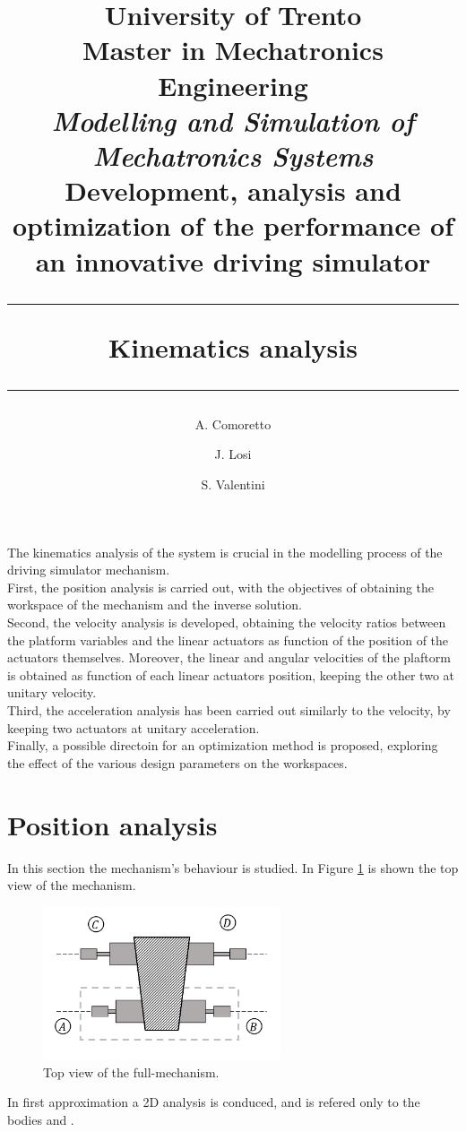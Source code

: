 \documentclass[10.5pt, twocolumn]{article}
\title{
	\large{University of Trento}\\
	\normalsize{Master in Mechatronics Engineering}\\
	\vspace{0.2cm}
	\large{\textit{Modelling and Simulation of Mechatronics Systems}}\\
	\vspace{0.2cm}
	\Large{\textbf{Development, analysis and optimization of the performance of an innovative driving simulator}}\\
	\vspace{0.25cm}
	\hrule
	\vspace{0.2cm}
	\large{\textbf{Kinematics analysis}}\\	%
	\vspace{0.2cm}
	\hrule
}
\author{A. Comoretto \and J. Losi \and S. Valentini}
\date{\vspace{0.5cm}}
\newcommand*\circled[1]{\tikz[baseline=(char.base)]{
	\node[shape=circle,draw,inner sep=2pt] (char) {#1};}}
\begin{document}
\maketitle

The kinematics analysis of the system is crucial in the modelling process of the driving simulator mechanism.\\
First, the position analysis is carried out, with the objectives of obtaining the workspace of the mechanism and the inverse solution.\\
Second, the velocity analysis is developed, obtaining the velocity ratios between the platform variables and the linear actuators as function of the position of the actuators themselves. Moreover, the linear and angular velocities of the plaftorm is obtained as function of each linear actuators position, keeping the other two at unitary velocity.\\
Third, the acceleration analysis has been carried out similarly to the velocity, by keeping two actuators at unitary acceleration.\\
Finally, a possible directoin for an optimization method is proposed, exploring the effect of the various design parameters on the workspaces.

\section{Position analysis}
\label{s:Position}
In this section the mechanism's behaviour is studied.
In Figure \ref{f:Top-View} is shown the top view of the mechanism.
\begin{figure}[h!]
	\centering
	\includegraphics[width=7cm]{Images/Mechanism_TopView}
	\caption{Top view of the full-mechanism.}
	\label{f:Top-View}
\end{figure}

In first approximation a 2D analysis is conduced, and is refered only to the bodies \circled{A} and \circled{B}.
\end{document}
